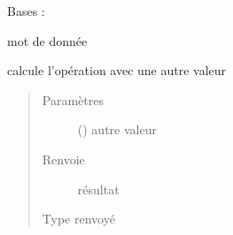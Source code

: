\documentclass[letterpaper,10pt,french]{sphinxmanual}
\begin{document}
\begin{fulllineitems}
\label{\detokenize{executeurcomponents:executeurcomponents.DataValue}}
Bases : 

mot de donnée

\begin{fulllineitems}
\label{\detokenize{executeurcomponents:executeurcomponents.DataValue.calc}}
calcule l’opération avec une autre valeur
\begin{quote}\begin{description}
\item[{Paramètres}] \leavevmode
{} ({\hyperref[\detokenize{executeurcomponents:executeurcomponents.DataValue}]{}}) \textendash{} autre valeur

\item[{Renvoie}] \leavevmode
résultat

\item[{Type renvoyé}] \leavevmode
{\hyperref[\detokenize{executeurcomponents:executeurcomponents.DataValue}]{}}

\end{description}\end{quote}

\end{fulllineitems}


\begin{fulllineitems}
\label{\detokenize{executeurcomponents:executeurcomponents.DataValue.clone}}
\end{fulllineitems}



\end{fulllineitems}
\end{document}
